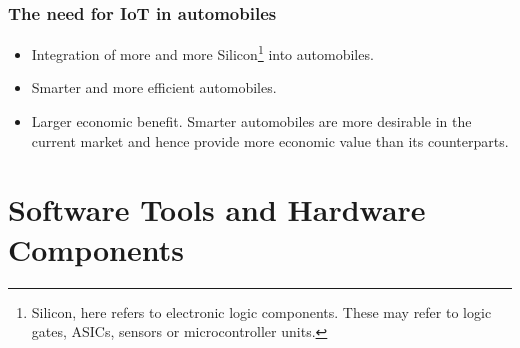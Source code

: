 \documentclass[]{book}
\providecommand{\tightlist}{%
  \setlength{\itemsep}{0pt}\setlength{\parskip}{0pt}}
\begin{document}
\subsection{The need for IoT in
automobiles}\label{the-need-for-iot-in-automobiles}

\begin{itemize}
\tightlist
\item
  Integration of more and more Silicon\footnote{Silicon, here refers to
    electronic logic components. These may refer to logic gates, ASICs,
    sensors or microcontroller units.} into automobiles.
\item
  Smarter and more efficient automobiles.
\item
  Larger economic benefit. Smarter automobiles are more desirable in the
  current market and hence provide more economic value than its
  counterparts.
\end{itemize}

\chapter{Software Tools and Hardware Components}\label{sec:tools}
\end{document}
